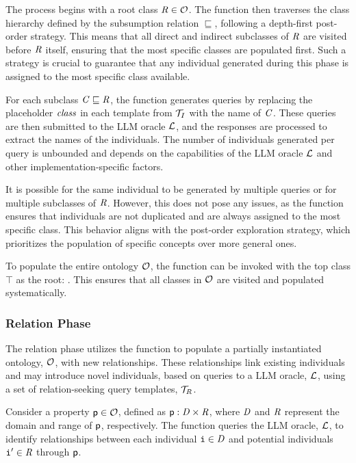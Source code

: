 The process begins with a root class $\concept{R} \in \relset{O}$.
%
The function then traverses the class hierarchy defined by the subsumption relation $\sqsubseteq$, following a depth-first post-order strategy.
%
This means that all direct and indirect subclasses of $\concept{R}$ are visited before $\concept{R}$ itself, ensuring that the most specific classes are populated first.
%
Such a strategy is crucial to guarantee that any individual generated during this phase is assigned to the most specific class available.


For each subclass $\concept{C} \sqsubseteq \concept{R}$, the function generates queries by replacing the placeholder $\mathit{class}$ in each template from $\relset{T}_{I}$ with the name of $\concept{C}$.
%
These queries are then submitted to the \gls{LLM} oracle $\relset{L}$, and the responses are processed to extract the names of the individuals.
%
The number of individuals generated per query is unbounded and depends on the capabilities of the \gls{LLM} oracle $\relset{L}$ and other implementation-specific factors.


It is possible for the same individual to be generated by multiple queries or for multiple subclasses of $\concept{R}$.
%
However, this does not pose any issues, as the \addToClass{} function ensures that individuals are not duplicated and are always assigned to the most specific class.
%
This behavior aligns with the post-order exploration strategy, which prioritizes the population of specific concepts over more general ones.


To populate the entire ontology $\relset{O}$, the function can be invoked with the top class $\top$ as the root:
%
.
%
This ensures that all classes in $\relset{O}$ are visited and populated systematically.


\subsubsection{Relation Phase}
\label{subsubsec:relation-phase}
%

%
The relation phase utilizes the \relate{} function to populate a partially instantiated ontology, \(\relset{O}\), with new relationships.
%
These relationships link existing individuals and may introduce novel individuals, based on queries to a \gls{LLM} oracle, \(\relset{L}\), using a set of relation-seeking query templates, \(\relset{T}_{R}\).

%
Consider a property \(\relation{p} \in \relset{O}\), defined as \(\relation{p} : \concept{D} \times \concept{R}\), where \(\concept{D}\) and \(\concept{R}\) represent the domain and range of \(\relation{p}\), respectively.
%
The function queries the \gls{LLM} oracle, \(\relset{L}\), to identify relationships between each individual \(\instance{i} \in \concept{D}\) and potential individuals \(\instance{i}' \in \concept{R}\) through \(\relation{p}\).

